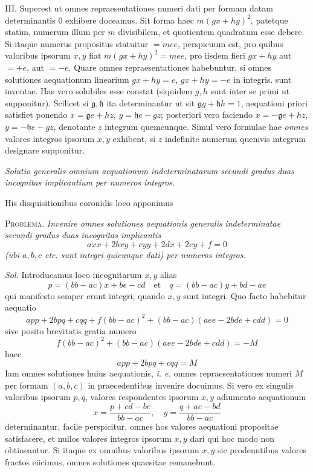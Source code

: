 III. Superest ut omnes repraesentationes numeri dati per formam datam determinantis 0 exhibere doceamus. Sit forma haec $m(gx+hy)^2$, patetque statim, numerum illum per $m$ divisibilem, et quotientem quadratum esse debere. Si itaque numerus propositus statuitur $=mee$, perspicuum est, pro quibus valoribus ipsorum $x,y$ fiat $m(gx+hy)^2=mee$, pro iisdem fieri $gx+hy$ aut $=+e$, aut $=-e$. Quare omnes repraesentationes habebuntur, si omnes solutiones aequationum linearium $gx+hy=e$, $gx+hy=-e$ in integris. sunt inventae. Has vero solubiles esse constat (siquidem $g,h$ sunt inter se primi ut supponitur). Scilicet si $\mathfrak{g},\mathfrak{h}$ ita determinantur ut sit $\mathfrak{g}g+\mathfrak{h}h=1$, aequationi priori satisfiet ponendo $x=\mathfrak{g}e+hz$, $y=\mathfrak{h}e-gz$; posteriori vero faciendo $x=-\mathfrak{g}e+hz$, $y=-\mathfrak{h}e-gz$, denotante $z$ integrum quemcunque. Simul vero formulae hae \textit{omnes} valores integros ipsorum $x,y$ exhibent, si $z$ indefinite numerum quemvis integrum designare supponitur.

\begin{center}
\textit{Solutio generalis omnium aequationum indeterminatarum secundi gradus duas incognitas implicantium per numeros integros.}
\end{center}

His disquisitionibus coronidis loco apponimus

\textsc{Problema.} \textit{Invenire omnes solutiones aequationis generalis} \textit{indeterminatae secundi gradus duas incognitas implicantis}
\[
axx+2bxy+cyy+2dx+2ey+f=0
\]
\textit{(ubi $a,b,c$ etc. sunt integri quicunque dati) per numeros integros.}

\textit{Sol.} Introducamus loco incognitarum $x,y$ alias
\[
p=(bb-ac)x+be-cd\quad\text{et}\quad q=(bb-ac)y+bd-ae
\]
qui manifesto semper erunt integri, quando $x,y$ sunt integri. Quo facto habebitur aequatio
\[
app+2bpq+cqq+f(bb-ac)^2+(bb-ac)(aee-2bde+cdd)=0
\]
sive posito brevitatis gratia numero
\[
f(bb-ac)^2+(bb-ac)(aee-2bde+cdd)=-M
\]
haec
\[
app+2bpq+cqq=M
\]
Iam omnes solutiones huius aequationis, \textit{i. e.} omnes repraesentationes numeri $M$ per formam $(a,b,c)$ in praecedentibus invenire docuimus. Si vero ex singulis valoribus ipsorum $p,q$, valores respondentes ipsorum $x,y$ adiumento aequationum
\[
x=\frac{p+cd-be}{bb-ac},\quad y=\frac{q+ae-bd}{bb-ac}
\]
determinantur, facile perspicitur, omnes hos valores aequationi propositae satisfacere, et nullos valores integros ipsorum $x,y$ dari qui hoc modo non obtineantur. Si itaque ex omnibus valoribus ipsorum $x,y$ sic prodeuntibus valores fractos eiicimus, omnes solutiones quaesitae remanebunt.

